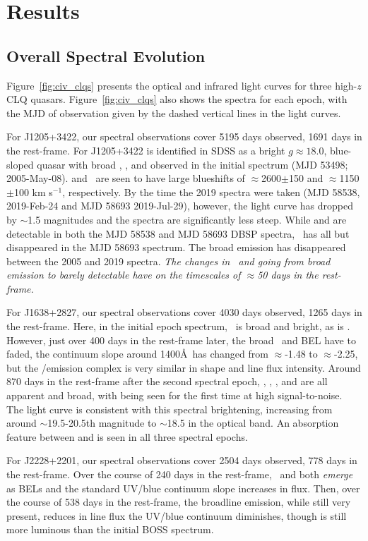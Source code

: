 \documentclass[a4paper,fleqn,usenatbib]{mnras}
\begin{document}
\section{Results}
\subsection{Overall Spectral Evolution}
Figure~\ref{fig:civ_clqs} presents the optical and infrared light
curves for three high-$z$ CLQ quasars.  Figure~\ref{fig:civ_clqs} also
shows the spectra for each epoch, with the MJD of observation given by
the dashed vertical lines in the light curves.

For J1205+3422, our spectral observations cover 5195 days observed, 1691 days
in the rest-frame. For J1205+3422 is identified in SDSS as a bright
$g\approx18.0$, blue-sloped quasar with broad \siiv, \civ, \ciii and
\mgii observed in the initial spectrum (MJD 53498; 2005-May-08). \ciii
and \civ\ are seen to have large blueshifts of $\approx$2600$\pm$150
and $\approx$1150$\pm$100 km s$^{-1}$, respectively.  By the time the
2019 spectra were taken (MJD 58538, 2019-Feb-24 and MJD 58693
2019-Jul-29), however, the light curve has dropped by $\sim$1.5
magnitudes and the spectra are significantly less steep.  While \lya
and \nv are detectable in both the MJD 58538 and MJD 58693 DBSP
spectra, \civ\ has all but disappeared in the MJD 58693 spectrum.  The
broad \ciii emission has disappeared between the 2005 and 2019
spectra. {\it The changes in \civ\ and \ciii going from broad emission to
barely detectable have on the timescales of $\approx$50 days in the rest-frame.} 

For J1638+2827, our spectral observations cover 4030 days observed, 1265 days
in the rest-frame. Here, in the initial epoch spectrum, \civ\ is broad
and bright, as is \ciii. However, just over 400 days in the rest-frame
later, the broad \civ\ and \ciii BEL have to faded, the continuum
slope around 1400\AA\ has changed from $\approx$-1.48 to
$\approx$-2.25, but the \lya/\nv emission complex is very similar in
shape and line flux intensity. Around 870 days in the rest-frame after
the second spectral epoch, \lya, \nv, \civ, \ciii and \mgii are all
apparent and broad, with \mgii being seen for the first time at high
signal-to-noise. The light curve is consistent with this spectral
brightening, increasing from around $\sim$19.5-20.5th magnitude to
$\sim$18.5 in the optical band. An absorption feature between  \lya and \nv
is seen in all three spectral epochs. 

For J2228+2201, our spectral observations cover 2504 days observed,
778 days in the rest-frame. Over the course of 240 days in the rest-frame, \civ\ and \ciii both {\it emerge} as BELs and
the standard UV/blue continuum slope increases in flux.
Then, over the course of 538 days in the rest-frame, the broadline emission, while still
very present, reduces in line flux the UV/blue continuum diminishes,
though is still more luminous than the initial BOSS spectrum. 
\end{document}
